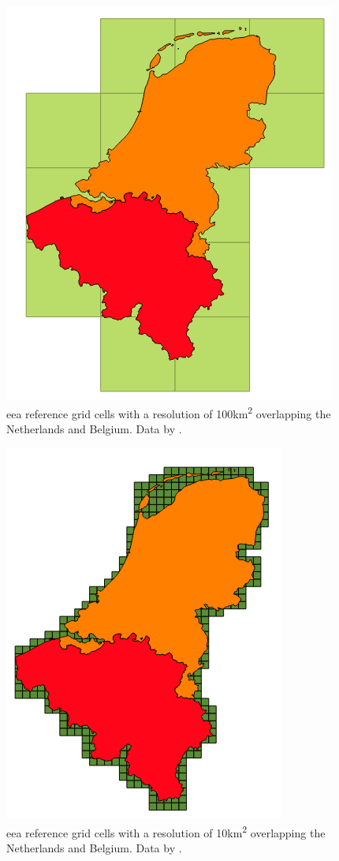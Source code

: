 \begin{figure}
	\centering
	\includegraphics[width=0.6\linewidth]{figs/EEA100km.png}
	\caption{\acf*{eea} reference grid cells with a resolution of 100km\textsuperscript{2} overlapping the Netherlands and Belgium. Data by \cite{DATA:EEA}.}
	\label{fig:100KM}
\end{figure}

\begin{figure}
	\centering
	\includegraphics[width=0.55\linewidth]{figs/EEA10km.png}
	\caption{\acs*{eea} reference grid cells with a resolution of 10km\textsuperscript{2} overlapping the Netherlands and Belgium. Data by \cite{DATA:EEA}.}
	\label{fig:10KM}
\end{figure}

